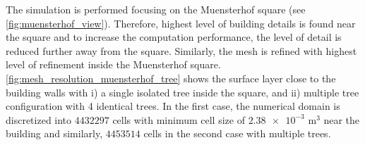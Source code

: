 The simulation is performed focusing on the Muensterhof square (see \cref{fig:muensterhof_view}). Therefore, highest level of building details is found near the square and to increase the computation performance, the level of detail is reduced further away from the square. Similarly, the mesh is refined with highest level of refinement inside the Muensterhof square. \cref{fig:mesh_resolution_muensterhof_tree} shows the surface layer close to the building walls with i) a single isolated tree inside the square, and ii) multiple tree configuration with 4 identical trees. In the first case, the numerical domain is discretized into $\num{4432297}$ cells with minimum cell size of $\num{2.38e-3}$ m$^{3}$ near the building and similarly, $\num{4453514}$ cells in the second case with multiple trees.



